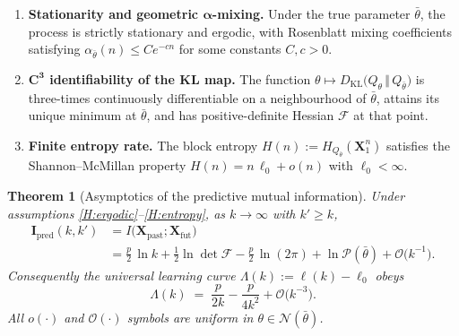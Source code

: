 \documentclass{article}
\newtheorem{theorem}{Theorem}[section]
\begin{document}
\begin{enumerate}

\item \label{H:ergodic} 
\textbf{Stationarity and geometric $\boldsymbol{\alpha}$-mixing.}\;
Under the true parameter $\bar\theta$, the process is strictly stationary and
ergodic, with Rosenblatt mixing coefficients satisfying
$\alpha_{\bar\theta}(n)\le C e^{-c n}$ for some constants $C,c>0$.

\item \label{H:ident} 
\textbf{$\boldsymbol{C^{3}}$ identifiability of the KL map.}\;
The function
$\theta\mapsto
  D_{\mathrm{KL}}\!\bigl(Q_\theta\,\Vert\,Q_{\bar\theta}\bigr)$
is three-times continuously differentiable on a neighbourhood of $\bar\theta$,
attains its unique minimum at $\bar\theta$, and has positive-definite Hessian
$\mathcal F$ at that point.

\item \label{H:entropy} 
\textbf{Finite entropy rate.}\;
The block entropy
$H(n):=H_{Q_{\bar\theta}}(\mathbf X_{1}^{n})$
satisfies the Shannon–McMillan property
$H(n)=n\,\ell_{0}+o(n)$ with $\ell_{0}<\infty$.

\end{enumerate}


\begin{theorem}[Asymptotics of the predictive mutual information]
\label{thm:PI}
Under assumptions \ref{H:ergodic}–\ref{H:entropy}, as $k\to\infty$ with
$k'\ge k$,
\begin{align}
  \mathbf I_{\mathrm{pred}}(k,k')
  &= I\!\bigl(\mathbf X_{\mathrm{past}};\mathbf X_{\mathrm{fut}}\bigr)
     \nonumber\\
  &= \frac{p}{2}\,\ln k
     + \frac12\ln\det\mathcal F
     - \frac{p}{2}\,\ln(2\pi)
     + \ln\mathcal P(\bar\theta)
     + \mathcal O\!\bigl(k^{-1}\bigr).
  \label{eq:PI-asympt}
\end{align}
Consequently the universal learning curve
$\Lambda(k):=\ell(k)-\ell_{0}$ obeys
\begin{equation}
  \Lambda(k)
  \;=\;
  \frac{p}{2k}
  -\frac{p}{4k^{2}}
  +\mathcal O\!\bigl(k^{-3}\bigr).
  \label{eq:Lambda-asympt}
\end{equation}
All $o(\cdot)$ and $\mathcal O(\cdot)$ symbols are uniform in
$\theta\in\mathcal N(\bar\theta)$.
\end{theorem}
\end{document}
